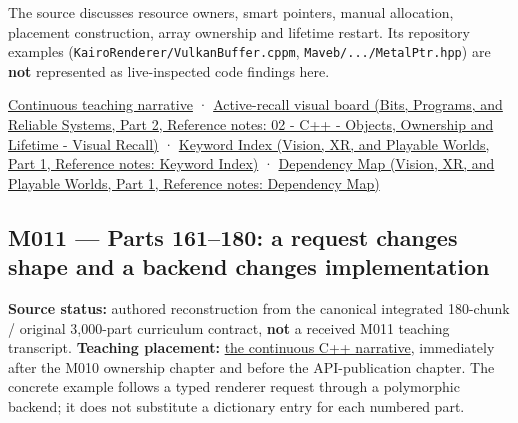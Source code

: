 The source discusses resource owners, smart pointers, manual allocation, placement construction, array ownership and lifetime restart. Its repository examples (\texttt{KairoRenderer/VulkanBuffer.cppm}, \texttt{Maveb/.../MetalPtr.hpp}) are \textbf{not} represented as live-inspected code findings here.

\hyperref[01-foundations-i-ch004-from-a-live-object-to-responsible-resource-ownership]{Continuous teaching narrative} · \href{../01-Bits-Programs-and-Reliable-Systems-P02/main.pdf\#nameddest=appendix-960160274237}{Active-recall visual board (Bits, Programs, and Reliable Systems, Part 2, Reference notes: 02 - C++ - Objects, Ownership and Lifetime - Visual Recall)} · \href{../07-Vision-XR-and-Playable-Worlds-P01/main.pdf\#nameddest=appendix-a6d556a4ef50}{Keyword Index (Vision, XR, and Playable Worlds, Part 1, Reference notes: Keyword Index)} · \href{../07-Vision-XR-and-Playable-Worlds-P01/main.pdf\#nameddest=appendix-4ad47bdd269a}{Dependency Map (Vision, XR, and Playable Worlds, Part 1, Reference notes: Dependency Map)}

\subsection{M011 --- Parts 161--180: a request changes shape and a backend changes implementation}\label{appendix-fd090d982a15-m011-parts-161180-a-request-changes-shape-and-a-backend-changes-implementation}

\hypertarget{appendix-fd090d982a15-m011-parts-161180-a-request-changes-shape-and-a-backend-changes-implementation}{}

\textbf{Source status:} authored reconstruction from the canonical integrated 180-chunk / original 3,000-part curriculum contract, \textbf{not} a received M011 teaching transcript. \textbf{Teaching placement:} \hyperref[01-foundations-i-ch004-from-one-owned-resource-to-many-requests-and-a-replaceable-backend]{the continuous C++ narrative}, immediately after the M010 ownership chapter and before the API-publication chapter. The concrete example follows a typed renderer request through a polymorphic backend; it does not substitute a dictionary entry for each numbered part.

